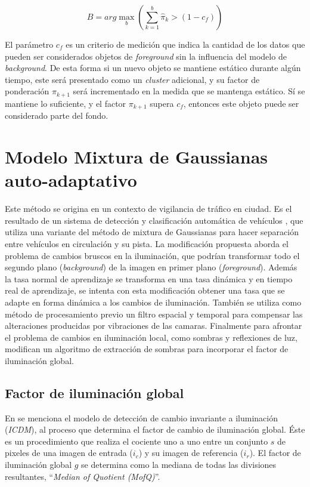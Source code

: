 \begin{equation} \label{eq:clusters}
B=arg \max_{b}  (\sum_{k=1}^{b} \hat{\pi}_k > (1 - c_f))
\end{equation}

El parámetro $c_f$ es un criterio de medición que indica la cantidad de los datos que pueden ser considerados objetos de \textit{foreground} sin la influencia del modelo de \textit{background}. De esta forma si un nuevo objeto se mantiene estático durante algún tiempo, este será presentado como un \textit{cluster} adicional, y su factor de ponderación $\pi_{k+1}$ será incrementado en la medida que se mantenga estático. Sí se mantiene lo suficiente, y el factor $\pi_{k+1}$ supera $c_f$, entonces este objeto puede ser considerado parte del fondo.


\section{Modelo Mixtura de Gaussianas auto-adaptativo}

Este método se origina en un contexto de vigilancia de tráfico en ciudad. Es el resultado de un sistema de detección y clasificación automática de vehículos \cite{chen_vehicle_2012}, que utiliza una variante del método de mixtura de Gaussianas\cite{zivkovic_efficient_2006} para hacer separación entre vehículos en circulación y su pista. La modificación propuesta aborda el problema de cambios bruscos en la iluminación, que podrían transformar todo el segundo plano (\textit{background}) de la imagen en primer plano (\textit{foreground}). Además la tasa normal de aprendizaje se transforma en una tasa dinámica y en tiempo real de aprendizaje, se intenta con esta modificación obtener una tasa que se adapte en forma dinámica a los cambios de iluminación. También se utiliza como método de procesamiento previo un filtro espacial y temporal\cite{chen_background_2009} para compensar las alteraciones producidas por vibraciones de las camaras. Finalmente para afrontar el problema de cambios en iluminación local, como sombras y reflexiones de luz, modifican un algoritmo de extracción de sombras \cite{horprasert_astatistical_1999} para incorporar el factor de iluminación global.


\subsection{Factor de iluminación global}
En \cite{chen_self-adaptive_2011} se menciona el modelo de detección de cambio invariante a iluminación (\textit{ICDM}), al proceso que determina el factor de cambio de iluminación global.  Éste es un procedimiento que realiza el cociente uno a uno entre un conjunto $s$ de pixeles de una imagen de entrada ($i_c$) y su imagen de referencia ($i_r$). El factor de iluminación global $g$ se determina como la mediana de todas las divisiones resultantes, ``\textit{Median of Quotient (MofQ)}''.


